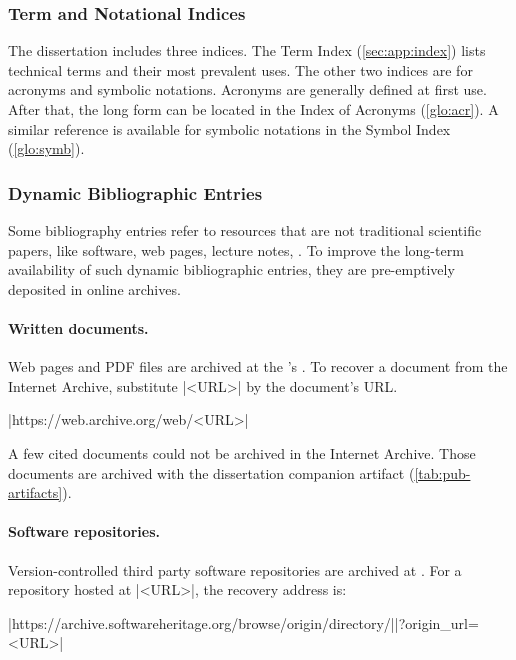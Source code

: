 \subsubsection{Term and Notational Indices}

The dissertation includes three indices.
The Term Index (\autoref{sec:app:index}) lists technical terms and their most prevalent uses.
The other two indices are for acronyms and symbolic notations.
Acronyms are generally defined at first use.
After that, the long form can be located in the Index of Acronyms (\autoref{glo:acr}).
A similar reference is available for symbolic notations in the Symbol Index (\autoref{glo:symb}).

\subsubsection{Dynamic Bibliographic Entries}

Some bibliography entries refer to resources that are not traditional scientific papers, like software, web pages, lecture notes, \etc.
To improve the long-term availability of such dynamic bibliographic entries, they are pre-emptively deposited in online archives.

\paragraph*{Written documents.}
Web pages and PDF files are archived at the 's .
To recover a document from the Internet Archive, substitute \pr|<URL>| by the document's URL\@.
\begin{center}\pr|https://web.archive.org/web/<URL>|\end{center}
A few cited documents could not be archived in the Internet Archive.
Those documents are archived with the dissertation companion artifact (\autoref{tab:pub-artifacts}).

\paragraph*{Software repositories.}
Version-controlled third party software repositories are archived at \href{https://softwareheritage.org}{}.
For a repository hosted at \pr|<URL>|, the recovery address is:%
\begin{center}\pr|https://archive.softwareheritage.org/browse/origin/directory/|\mbox{\pr|?origin_url=<URL>|}\end{center}

